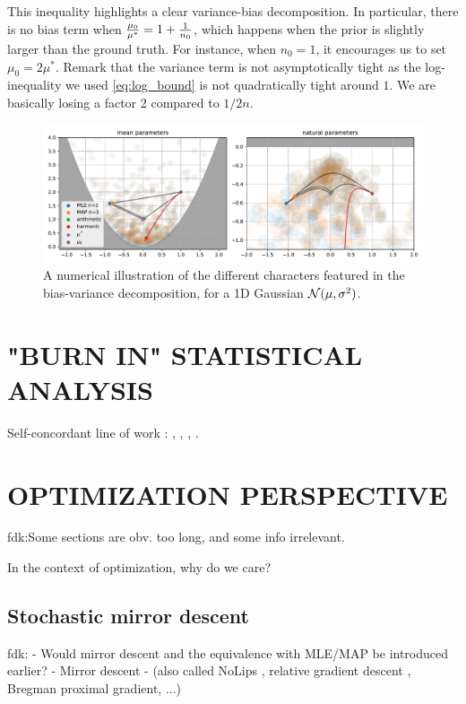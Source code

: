 \documentclass[twoside]{article}
\let\oldsection\section
\renewcommand{\section}[1]{\oldsection{\texorpdfstring{\uppercase{#1}}{#1}}}
\newcommand{\fdk}[1]{\textcolor{Periwinkle}{fdk:#1}}
\begin{document}
This inequality highlights a clear variance-bias decomposition.
In particular, there is no bias term when $\frac{\mu_0}{\mu^*} =1 + \frac{1}{n_0} $, which happens when the prior is slightly larger than the ground truth.  For instance, when $n_0=1$, it encourages us to set $\mu_0 = 2 \mu^*$.
Remark that the variance term is not asymptotically tight as the log-inequality we used \eqref{eq:log_bound} is not quadratically tight around $1$. We are basically losing a factor 2 compared to $1/2n$.


\begin{figure}[t]
	\centering
	\includegraphics[width=\textwidth]{figs/thales/numerical_schema_n=3.pdf}
	\caption{A numerical illustration of the different characters featured in the bias-variance decomposition, for a 1D Gaussian ${\mathcal N}(\mu, \sigma^2)$.}
	\label{fig:bias-variance-numerical}
\end{figure}

\section{"Burn In" Statistical Analysis}
Self-concordant line of work : 
\citet{bubeck2015entropic}
\citet{kakade2010learning},
\citet{anastasiou2017bounds},
\citet{marteauferey2019beyond},
\citet{ostrovskii2021finite}.



\section{Optimization Perspective}
\fdk{Some sections are obv. too long, and some info irrelevant.}

In the context of optimization, why do we care? 

\subsection{Stochastic mirror descent}

\fdk{
- Would mirror descent and the equivalence with MLE/MAP be introduced earlier?
- Mirror descent \citep{nemirovski1983problem,beck2003mirror}
- (also called NoLips \citep{bauschke2017descent}, 
relative gradient descent \citep{hanzely2018fastest},
Bregman proximal gradient, ...)
}
\end{document}
